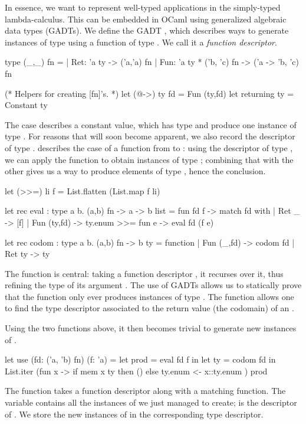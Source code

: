 In essence, we want to represent well-typed applications in the
simply-typed lambda-calculus. This can be embedded in OCaml using generalized
algebraic data types (GADTs). We define the GADT , which
describes ways to generate instances of type  using a function of type
. We call it a \emph{function descriptor}.
%
\begin{ocamlcode}
type (_,_) fn =
| Ret: 'a ty -> ('a,'a) fn
| Fun: 'a ty * ('b, 'c) fn -> ('a -> 'b, 'c) fn

(* Helpers for creating [fn]'s. *)
let (@->) ty fd = Fun (ty,fd)
let returning ty = Constant ty
\end{ocamlcode}
%
The  case describes a constant value, which has type  and
produce one instance of type . For reasons that will soon become
apparent, we also record the descriptor of type .  describes
the case of a function from  to : using the descriptor of type
, we can apply the function to obtain instances of type ;
combining that with the other  gives us a way to produce
elements of type , hence the  conclusion.
%
\begin{ocamlcode}
let (>>=) li f = List.flatten (List.map f li)

let rec eval : type a b. (a,b) fn -> a -> b list =
  fun fd f ->
    match fd with
    | Ret _ -> [f]
    | Fun (ty,fd) ->
        ty.enum >>= fun e -> eval fd (f e)

let rec codom : type a b. (a,b) fn -> b ty =
  function
    | Fun (_,fd) -> codom fd
    | Ret ty -> ty
\end{ocamlcode}
%
The  function is central: taking a function descriptor , it
recurses over it, thus refining the type of its argument . The use of
GADTs allows us to statically prove that the  function only ever
produces instances of type .
%
The  function allows one to find the type
descriptor associated to the return value (the codomain) of an .

Using the two functions above, it then becomes trivial to generate new instances
of .
%
\begin{ocamlcode}
let use (fd: ('a, 'b) fn) (f: 'a) =
  let prod = eval fd f in
  let ty = codom fd in
  List.iter (fun x -> 
    if mem x ty then () else ty.enum <- x::ty.enum
  ) prod
\end{ocamlcode}
%
The function takes a function descriptor along with a matching function. The
 variable contains all the instances of  we just managed to
create;  is the descriptor of . We store the new
instances of  in the corresponding type descriptor.

